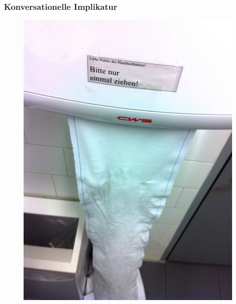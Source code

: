 
\begin{frame}
\frametitle{Konversationelle Implikatur}

\begin{figure}
\centering

\begin{minipage}[t]{0.45\textwidth}
\includegraphics[width=\textwidth]{material/14Prag2}
\end{minipage}
%
\begin{minipage}[t]{0.45\textwidth}

\end{minipage}
\end{figure}
\end{frame}
